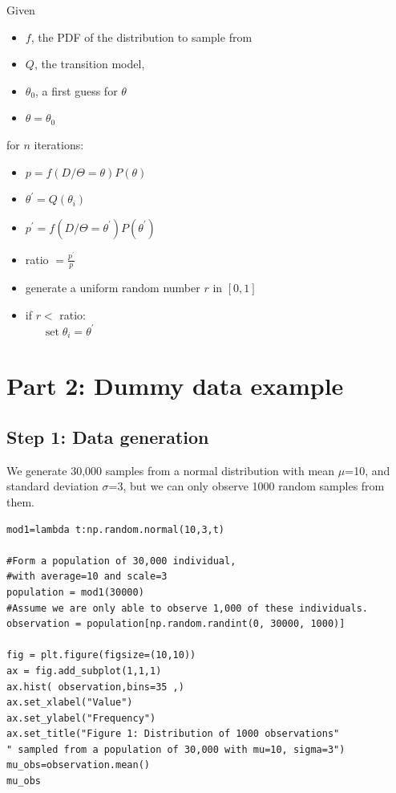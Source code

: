 Given
\begin{itemize}[itemsep=-1ex]
\item $f$, the PDF of the distribution to sample from
\item $Q$, the transition model,
\item $\theta_{0}$, a first guess for $\theta$
\item $\theta=\theta_{0}$ 
\end{itemize}
for $n$ iterations:
\begin{itemize}[itemsep=-1ex]
\item $p=f(D / \Theta=\theta) P(\theta)$
\item $\theta^{\prime}=Q\left(\theta_{i}\right)$
\item $p^{\prime}=f\left(D / \Theta=\theta^{\prime}\right) P\left(\theta^{\prime}\right)$
\item ratio $=\frac{p^{\prime}}{p}$
\item generate a uniform random number $r$ in $[0,1]$
\item if $r<$ ratio:\\
\ \ \ $\operatorname{set} \theta_{i}=\theta^{\prime}$
\end{itemize}

\section{Part 2: Dummy data example}

\subsection{Step 1: Data generation}
We generate 30,000 samples from a normal distribution with mean  $\mu$=10, and standard deviation $\sigma$=3, but we can only observe 1000 random samples from them.
\begin{lstlisting}
mod1=lambda t:np.random.normal(10,3,t)

#Form a population of 30,000 individual, 
#with average=10 and scale=3
population = mod1(30000)
#Assume we are only able to observe 1,000 of these individuals.
observation = population[np.random.randint(0, 30000, 1000)]

fig = plt.figure(figsize=(10,10))
ax = fig.add_subplot(1,1,1)
ax.hist( observation,bins=35 ,)
ax.set_xlabel("Value")
ax.set_ylabel("Frequency")
ax.set_title("Figure 1: Distribution of 1000 observations"
" sampled from a population of 30,000 with mu=10, sigma=3")
mu_obs=observation.mean()
mu_obs
\end{lstlisting}


